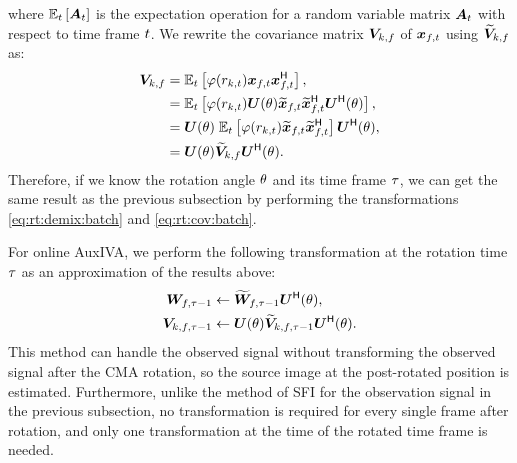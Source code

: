 \documentclass[sip,biber]{now-journal}
\newcommand{\todo}[1]{\textcolor{red}{#1}}
\begin{document}
where $\mathbb{E} _{t}\left[\bm{A} _{t}\right]$ is the expectation operation for a random variable matrix $\bm{A}_{t}$ with respect to time frame $t$.
We rewrite the covariance matrix ${\bm{V}} _{k,f}$ of $\Obs _{\ft}$ using $\widetilde{\bm{V}} _{k,f}$ as:
\begin{align}
  \cov _{\src,\freq} &= \expct  _{\tframe} \left[\weight (\var _{\src,\tframe}) \Obs _{\ft} \Obs _{\ft} ^{\hermite}\right], \\
                     &= \expct  _{\tframe} \left[\weight (\var _{\src,\tframe}) \rotMat (\rotSpat) \refpos{\Obs} _{\ft} \refpos{\Obs} _{\ft} ^{\hermite} \rotMat ^{\hermite} (\rotSpat)\right], \\
                     &= \rotMat (\rotSpat)\; \expct  _{\tframe} \left[\weight (\var _{\src,\tframe}) \refpos{\Obs} _{\ft} \refpos{\Obs} _{\ft} ^{\hermite} \right] \rotMat ^{\hermite} (\rotSpat), \\
                     &= \rotMat (\rotSpat) \refpos{\cov} _{\src,\freq} \rotMat ^{\hermite} (\rotSpat). \label{eq:rt:cov:batch}
\end{align}
Therefore, if we know the rotation angle $\theta$ and its time frame $\tau$, we can get the same result as the previous subsection by performing the transformations \eqref{eq:rt:demix:batch} and \eqref{eq:rt:cov:batch}.

For online AuxIVA, we perform the following transformation at the rotation time $\tau$ as an approximation of the results above:
\begin{align}
  \bm{W} _{f,\tau - 1} &\gets \widetilde{\bm{W}} _{f,\tau - 1} \bm{U} ^{\mathsf{H}} (\theta), \\
  \bm{V} _{k,f,\tau - 1} &\gets \bm{U} (\theta) \widetilde{\bm{V}} _{k,f,\tau - 1} \bm{U} ^{\mathsf{H}} (\theta).
\end{align}
This method can handle the observed signal without transforming the observed signal after the CMA rotation, so the source image at the post-rotated position is estimated.
Furthermore, unlike the method of SFI for the observation signal in the previous subsection, no transformation is required for every single frame after rotation, and only one transformation at the time of the rotated time frame is needed.
\todo{%
}
\end{document}
